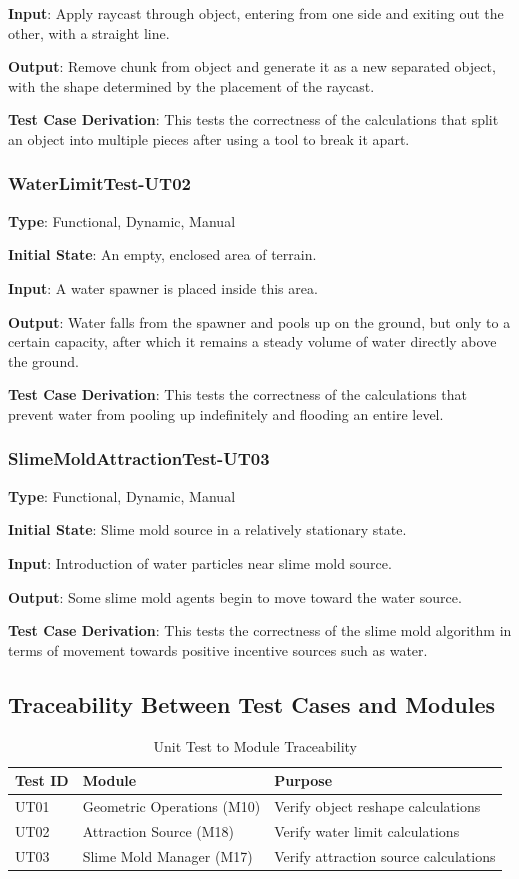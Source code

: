 \documentclass[12pt, titlepage]{article}
\begin{document}
\textbf{Input}: Apply raycast through object, entering from one side and exiting
out the other, with a straight line.

\textbf{Output}: Remove chunk from object and generate it as a new separated object,
with the shape determined by the placement of the raycast.

\textbf{Test Case Derivation}: This tests the correctness of the calculations that
split an object into multiple pieces after using a tool to break it apart.


\subsubsection{WaterLimitTest-UT02}

\textbf{Type}: Functional, Dynamic, Manual

\textbf{Initial State}: An empty, enclosed area of terrain.

\textbf{Input}: A water spawner is placed inside this area.

\textbf{Output}: Water falls from the spawner and pools up on the ground,
but only to a certain capacity, after which it remains a steady volume
of water directly above the ground.

\textbf{Test Case Derivation}: This tests the correctness of the calculations
that prevent water from pooling up indefinitely and flooding an entire level.


\subsubsection{SlimeMoldAttractionTest-UT03}

\textbf{Type}: Functional, Dynamic, Manual

\textbf{Initial State}: Slime mold source in a relatively stationary state.

\textbf{Input}: Introduction of water particles near slime mold source.

\textbf{Output}: Some slime mold agents begin to move toward the water source.

\textbf{Test Case Derivation}: This tests the correctness of the slime mold
algorithm in terms of movement towards positive incentive sources such as water.


\subsection{Traceability Between Test Cases and Modules}
\begin{table}[H]
\caption{Unit Test to Module Traceability}
\begin{tabular}{|p{2cm}|p{6cm}|p{7cm}|}
\hline
\textbf{Test ID} & \textbf{Module} & \textbf{Purpose} \\ \hline
UT01 & Geometric Operations (M10) & Verify object reshape calculations \\ \hline
UT02 & Attraction Source (M18) & Verify water limit calculations \\ \hline
UT03 & Slime Mold Manager (M17) & Verify attraction source calculations \\ \hline
\end{tabular}
\end{table}
\end{document}
